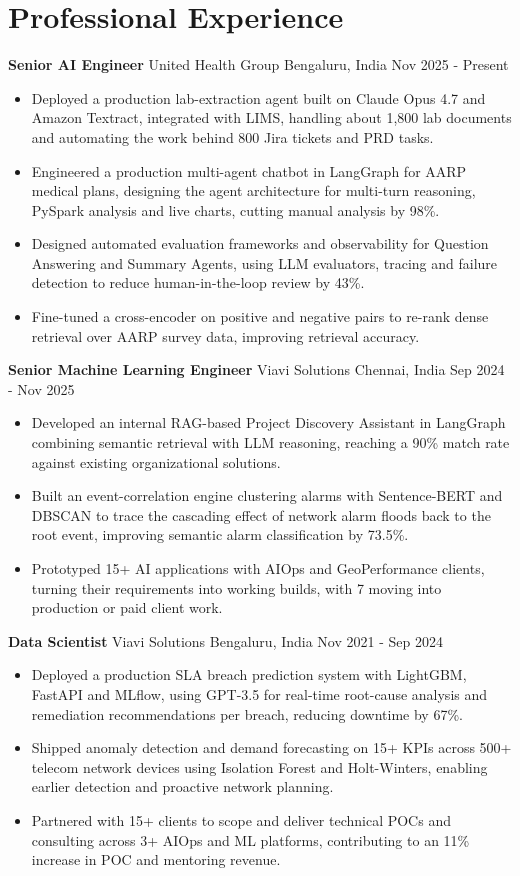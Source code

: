 \documentclass[10pt,a4paper]{article}
\newcommand{\role}[4]{\textbf{#1} \textbar{} #2 \hfill #3 \textbar{} #4\par}
\begin{document}
\section{Professional Experience}
\role{Senior AI Engineer}{United Health Group}{Bengaluru, India}{Nov 2025 - Present}
\begin{itemize}
  \item Deployed a production lab-extraction agent built on Claude Opus 4.7 and Amazon Textract, integrated with LIMS, handling about 1,800 lab documents and automating the work behind 800 Jira tickets and PRD tasks.
  \item Engineered a production multi-agent chatbot in LangGraph for AARP medical plans, designing the agent architecture for multi-turn reasoning, PySpark analysis and live charts, cutting manual analysis by 98\%.
  \item Designed automated evaluation frameworks and observability for Question Answering and Summary Agents, using LLM evaluators, tracing and failure detection to reduce human-in-the-loop review by 43\%.
  \item Fine-tuned a cross-encoder on positive and negative pairs to re-rank dense retrieval over AARP survey data, improving retrieval accuracy.
\end{itemize}
\vspace{3pt}
\role{Senior Machine Learning Engineer}{Viavi Solutions}{Chennai, India}{Sep 2024 - Nov 2025}
\begin{itemize}
  \item Developed an internal RAG-based Project Discovery Assistant in LangGraph combining semantic retrieval with LLM reasoning, reaching a 90\% match rate against existing organizational solutions.
  \item Built an event-correlation engine clustering alarms with Sentence-BERT and DBSCAN to trace the cascading effect of network alarm floods back to the root event, improving semantic alarm classification by 73.5\%.
  \item Prototyped 15+ AI applications with AIOps and GeoPerformance clients, turning their requirements into working builds, with 7 moving into production or paid client work.
\end{itemize}
\vspace{3pt}
\role{Data Scientist}{Viavi Solutions}{Bengaluru, India}{Nov 2021 - Sep 2024}
\begin{itemize}
  \item Deployed a production SLA breach prediction system with LightGBM, FastAPI and MLflow, using GPT-3.5 for real-time root-cause analysis and remediation recommendations per breach, reducing downtime by 67\%.
  \item Shipped anomaly detection and demand forecasting on 15+ KPIs across 500+ telecom network devices using Isolation Forest and Holt-Winters, enabling earlier detection and proactive network planning.
  \item Partnered with 15+ clients to scope and deliver technical POCs and consulting across 3+ AIOps and ML platforms, contributing to an 11\% increase in POC and mentoring revenue.
\end{itemize}
\end{document}
